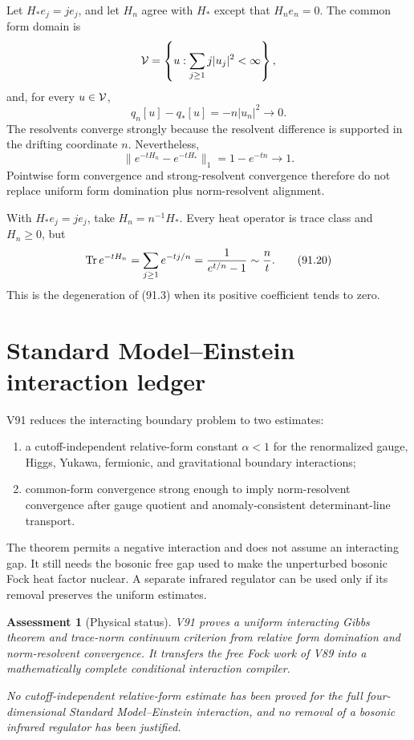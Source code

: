 \documentclass[11pt]{article}
\newtheorem{assessment}[theorem]{Assessment}
\theoremstyle{remark}
\begin{document}
\begin{counterexample}
\label{cnt:v15v91-drifting}
Let \(H_*e_j=je_j\), and let \(H_n\) agree with \(H_*\) except that
\(H_ne_n=0\).  The common form domain is
\[
 {\cal V}=\left\{u:\sum_{j\geq1}j|u_j|^2<\infty\right\},
\]
and, for every \(u\in{\cal V}\),
\[
 q_n[u]-q_*[u]=-n|u_n|^2\longrightarrow0.             \tag{91.18}
\]
The resolvents converge strongly because the resolvent difference
is supported in the drifting coordinate \(n\).  Nevertheless,
\[
 \|e^{-tH_n}-e^{-tH_*}\|_1=1-e^{-tn}\longrightarrow1. \tag{91.19}
\]
Pointwise form convergence and strong-resolvent convergence
therefore do not replace uniform form domination plus
norm-resolvent alignment.
\end{counterexample}

\begin{counterexample}
\label{cnt:v15v91-alpha}
With \(H_*e_j=je_j\), take \(H_n=n^{-1}H_*\).  Every heat operator
is trace class and \(H_n\geq0\), but
\[
 \operatorname{Tr}e^{-tH_n}
 =\sum_{j\geq1}e^{-tj/n}
 ={1\over e^{t/n}-1}\sim{n\over t}.                   \tag{91.20}
\]
This is the degeneration of (91.3) when its positive coefficient
tends to zero.
\end{counterexample}

\section{Standard Model--Einstein interaction ledger}

V91 reduces the interacting boundary problem to two estimates:
\begin{enumerate}
\item a cutoff-independent relative-form constant
      \(\alpha<1\) for the renormalized gauge, Higgs, Yukawa,
      fermionic, and gravitational boundary interactions;
\item common-form convergence strong enough to imply norm-resolvent
      convergence after gauge quotient and anomaly-consistent
      determinant-line transport.
\end{enumerate}
The theorem permits a negative interaction and does not assume an
interacting gap.  It still needs the bosonic free gap used to make
the unperturbed bosonic Fock heat factor nuclear.  A separate
infrared regulator can be used only if its removal preserves the
uniform estimates.

\begin{assessment}[Physical status]
\label{ass:v15v91-status}
V91 proves a uniform interacting Gibbs theorem and trace-norm
continuum criterion from relative form domination and
norm-resolvent convergence.  It transfers the free Fock work of
V89 into a mathematically complete conditional interaction
compiler.

No cutoff-independent relative-form estimate has been proved for
the full four-dimensional Standard Model--Einstein interaction,
and no removal of a bosonic infrared regulator has been justified.
\end{assessment}
\end{document}
